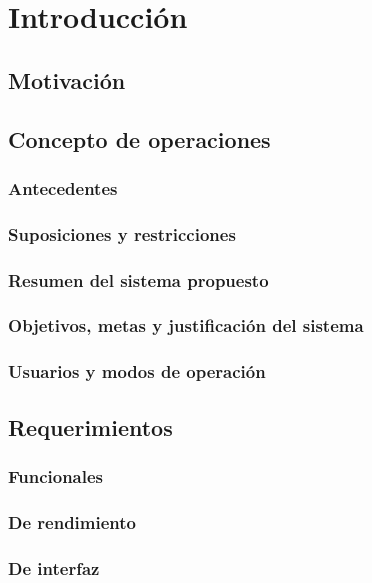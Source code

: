\chapter{Introducción}
    \section{Motivación}
    \section{Concepto de operaciones}
        \subsection{Antecedentes}
        \subsection{Suposiciones y restricciones}
        \subsection{Resumen del sistema propuesto}
        \subsection{Objetivos, metas y justificación del sistema}
        \subsection{Usuarios y modos de operación}
    \section{Requerimientos}
        \subsection{Funcionales}
        \subsection{De rendimiento}
        \subsection{De interfaz}